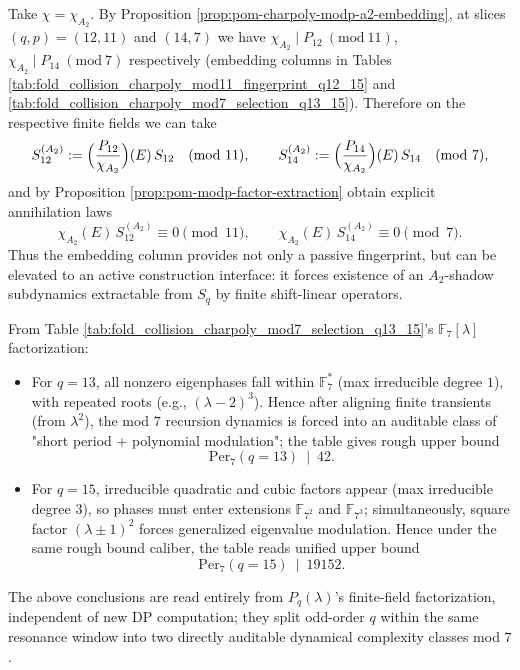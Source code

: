 \begin{remark}\label{rem:pom-a2-subrecurrence-extraction}
Take \(\chi=\chi_{A_2}\). By Proposition \ref{prop:pom-charpoly-modp-a2-embedding},
at slices \((q,p)=(12,11)\) and \((14,7)\) we have \(\chi_{A_2}\mid P_{12}\ (\mathrm{mod}\ 11)\), \(\chi_{A_2}\mid P_{14}\ (\mathrm{mod}\ 7)\) respectively (embedding columns in Tables \ref{tab:fold_collision_charpoly_mod11_fingerprint_q12_15} and \ref{tab:fold_collision_charpoly_mod7_selection_q13_15}).
Therefore on the respective finite fields we can take
\[
S_{12}^{(A_2)}:=\Bigl(\frac{P_{12}}{\chi_{A_2}}\Bigr)(E)\,S_{12}\quad(\mathrm{mod}\ 11),
\qquad
S_{14}^{(A_2)}:=\Bigl(\frac{P_{14}}{\chi_{A_2}}\Bigr)(E)\,S_{14}\quad(\mathrm{mod}\ 7),
\]
and by Proposition \ref{prop:pom-modp-factor-extraction} obtain explicit annihilation laws
\[
\chi_{A_2}(E)\,S_{12}^{(A_2)}\equiv 0\pmod{11},
\qquad
\chi_{A_2}(E)\,S_{14}^{(A_2)}\equiv 0\pmod{7}.
\]
Thus the embedding column provides not only a passive fingerprint, but can be elevated to an active construction interface: it forces existence of an \(A_2\)-shadow subdynamics extractable from \(S_q\) by finite shift-linear operators.
\end{remark}

\begin{remark}\label{rem:pom-charpoly-mod7-selection}
From Table \ref{tab:fold_collision_charpoly_mod7_selection_q13_15}'s \(\mathbb{F}_7[\lambda]\) factorization:
\begin{itemize}
  \item For \(q=13\), all nonzero eigenphases fall within \(\mathbb{F}_7^\ast\) (max irreducible degree \(1\)), with repeated roots (e.g., \((\lambda-2)^3\)).
  Hence after aligning finite transients (from \(\lambda^2\)), the mod \(7\) recursion dynamics is forced into an auditable class of "short period + polynomial modulation"; the table gives rough upper bound
  \[
  \mathrm{Per}_7(q=13)\ \mid\ 42.
  \]
  \item For \(q=15\), irreducible quadratic and cubic factors appear (max irreducible degree \(3\)), so phases must enter extensions \(\mathbb{F}_{7^2}\) and \(\mathbb{F}_{7^3}\);
  simultaneously, square factor \((\lambda\pm 1)^2\) forces generalized eigenvalue modulation.
  Hence under the same rough bound caliber, the table reads unified upper bound
  \[
  \mathrm{Per}_7(q=15)\ \mid\ 19152.
  \]
\end{itemize}
The above conclusions are read entirely from \(P_q(\lambda)\)'s finite-field factorization, independent of new DP computation; they split odd-order \(q\) within the same resonance window into two directly auditable dynamical complexity classes mod \(7\).
\end{remark}

